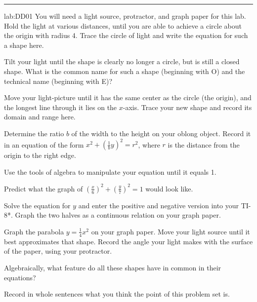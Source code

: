 \renewcommand{\columnseprule}{1.5pt}
\begin{multicols*}{2}
\rule[0.5\baselineskip]{0.4\textwidth}{1pt}
\noindent
{}\label{lab:DD01}
\begin{exercises}{lab:DD01}
\lab[] You will need a light source, protractor, and graph paper for this lab.  Hold the light at various distances, until you are able to achieve a circle about the origin with radius 4.  Trace the circle of light and write the equation for such a shape here.

\vspace{3cm}
\lab[] Tilt your light until the shape is clearly no longer a circle, but is still a closed shape.  What is the common name for such a shape (beginning with O) and the technical name (beginning with E)?

\vspace{2cm}
\lab[] Move your light-picture until it has the same center as the circle (the origin), and the longest line through it lies on the $x$-axis.  Trace your new shape and record its domain and range here.

\vspace{2cm}
\lab[] Determine the ratio $b$ of the width to the height on your oblong object.  Record it in an equation of the form $x^2+\left(\frac{1}{b}y\right)^2=r^2$, where $r$ is the distance from the origin to the right edge.

\vspace{3cm}
\lab[] Use the tools of algebra to manipulate your equation until it equals 1.

\vspace{3cm}
\lab[] Predict what the graph of $\left(\frac{x}{6}\right)^2 + \left(\frac{y}{7}\right)^2 = 1$ would look like.

\vspace{3cm}
\lab[] Solve the equation for $y$ and enter the positive and negative version into your TI-8*.  Graph the two halves as a continuous relation on your graph paper.

\vspace{2cm}
\lab[] Graph the parabola $y=\frac{1}{4}x^2$ on your graph paper.  Move your light source until it best approximates that shape.  Record the angle your light makes with the surface of the paper, using your protractor.

\vspace{2cm}
\lab[] Algebraically, what feature do all these shapes have in common in their equations?

\vspace{2cm}
\lab[] Record in whole sentences what you think the point of this problem set is.






\end{exercises}
\end{multicols*}
